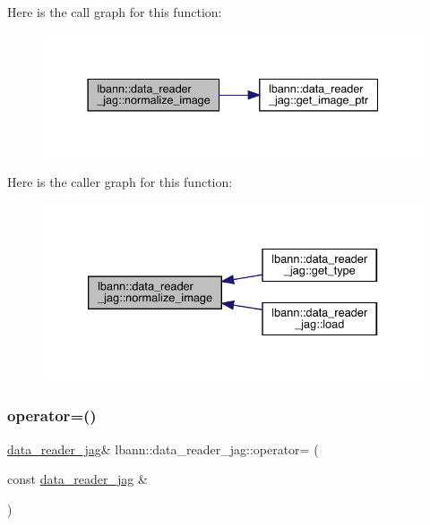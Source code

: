 Here is the call graph for this function\+:\nopagebreak
\begin{figure}[H]
\begin{center}
\leavevmode
\includegraphics[width=337pt]{classlbann_1_1data__reader__jag_ad145def7b548ca2d0d3f207f6376b114_cgraph}
\end{center}
\end{figure}
Here is the caller graph for this function\+:\nopagebreak
\begin{figure}[H]
\begin{center}
\leavevmode
\includegraphics[width=333pt]{classlbann_1_1data__reader__jag_ad145def7b548ca2d0d3f207f6376b114_icgraph}
\end{center}
\end{figure}
\mbox{\label{classlbann_1_1data__reader__jag_adb817a2f42297e4881f128dd88ee9b61}} 
\subsubsection{\texorpdfstring{operator=()}{operator=()}}
{\footnotesize\ttfamily \hyperlink{classlbann_1_1data__reader__jag}{data\+\_\+reader\+\_\+jag}\& lbann\+::data\+\_\+reader\+\_\+jag\+::operator= (\begin{DoxyParamCaption}\item[{const \hyperlink{classlbann_1_1data__reader__jag}{data\+\_\+reader\+\_\+jag} \&}]{ }\end{DoxyParamCaption})\hspace{0.3cm}{\ttfamily [default]}}

